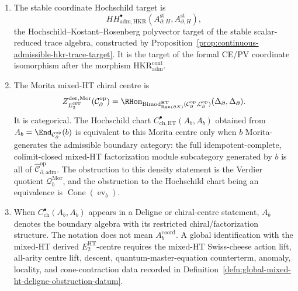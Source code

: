 \begin{defn}
\begin{enumerate}[label=\textup{(\roman*)}]
\[    \]
    For \(\rho\in P\) and \(f\in\mathfrak h\), the assignments
    \[
      c^\rho\longmapsto\partial_\rho,
      \qquad
      u_f\longmapsto O_f=J(f),
      \qquad
      d_{\mathrm{CE}}u_f\longmapsto
      X_f=d_\pi O_f
    \]
    have coordinate degrees
    \(|c^\rho|=|\partial_\rho|=1\),
    \(|u_f|=|O_f|=0\), and
    \(|d_{\mathrm{CE}}u_f|=|X_f|=1\).  They are generator boundary
    values into this complex until an admissible Hochschild-centre
    Maurer--Cartan lift and its centrality primitives have been supplied.
	  \item The stable coordinate Hochschild target is
	    \[
	      HH^\bullet_{\mathrm{adm},\mathrm{HKR}}
	      (A_{\partial,H}^{\mathrm{st}},A_{\partial,H}^{\mathrm{st}}),
	    \]
	    the Hochschild--Kostant--Rosenberg polyvector target of the
	    stable scalar-reduced trace algebra, constructed by
	    Proposition~\ref{prop:continuous-admissible-hkr-trace-target}.  It
	    is the target of the formal CE/PV coordinate isomorphism after the
	    morphism
	    \(\mathrm{HKR}^{\mathrm{cont}}_{\mathrm{adm}}\).
	  \item The Morita mixed-HT chiral centre is
	    \[
	      Z^{\mathrm{der},\mathrm{Mor}}_{E_2^{\mathrm{HT}}}
	      (\mathcal C^{\mathrm{op}}_\partial)
	      =
	      \RHom_{\mathrm{Bimod}^{\mathrm{HT}}_{\operatorname{Ran}(\partial X)}
	      (\mathcal C^{\mathrm{op}}_\partial,\mathcal C^{\mathrm{op}}_\partial)}
	      (\Delta_\partial,\Delta_\partial).
	    \]
	    It is categorical.  The Hochschild chart
	    \(C^\bullet_{\mathrm{ch},\mathrm{HT}}(A_b,A_b)\) obtained from
	    \(A_b=\End_{\mathcal C^{\mathrm{op}}_\partial}(b)\) is equivalent
	    to this Morita centre only when \(b\) Morita-generates the
	    admissible boundary category: the full idempotent-complete,
	    colimit-closed mixed-HT factorization module subcategory generated
	    by \(b\) is all of
	    \(\widehat{\mathcal C}^{\mathrm{op}}_{\partial,\mathrm{adm}}\).
	    The obstruction to this density statement is the Verdier quotient
	    \(\mathcal Q_b^{\mathrm{Mor}}\), and the obstruction to the
	    Hochschild chart being an equivalence is
	    \(\operatorname{Cone}(\operatorname{ev}_b)\).
	  \item When \(C^\bullet_{\mathrm{ch}}(A_b,A_b)\) appears in a
	    Deligne or chiral-centre statement, \(A_b\) denotes the boundary
    algebra with its restricted chiral/factorization structure.  The
    notation does not mean \(A_b^{\mathrm{coord}}\).  A global
    identification with the mixed-HT derived \(E_2^{\mathrm{HT}}\)-centre requires the
    mixed-HT Swiss-cheese action lift, all-arity centre lift, descent,
    quantum-master-equation counterterm, anomaly, locality, and cone-contraction
    data recorded in
    Definition~\ref{defn:global-mixed-ht-deligne-obstruction-datum}.
\end{enumerate}
\end{defn}

